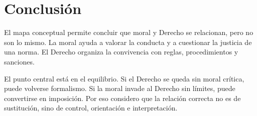 \documentclass[
	spanish,
	letterpaper, oneside
]{article}
\begin{document}
%

\section{Conclusión}

El mapa conceptual permite concluir que moral y Derecho se relacionan, pero no son lo mismo. La moral ayuda a valorar la conducta y a cuestionar la justicia de una norma. El Derecho organiza la convivencia con reglas, procedimientos y sanciones.

El punto central está en el equilibrio. Si el Derecho se queda sin moral crítica, puede volverse formalismo. Si la moral invade al Derecho sin límites, puede convertirse en imposición. Por eso considero que la relación correcta no es de sustitución, sino de control, orientación e interpretación.
\end{document}
